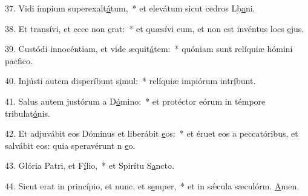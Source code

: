 37. Vidi ímpium superexalt\uline{á}tum,~* et elevátum sicut cedros Lb\uline{a}ni.\par 
38. Et transívi, et ecce non \uline{e}rat:~* et quæsívi eum, et non est invéntus locs \uline{e}jus.\par 
39. Custódi innocéntiam, et vide æquit\uline{á}tem:~* quóniam sunt relíquiæ hómini pacf\uline{i}co.\par 
40. Injústi autem disperíbunt s\uline{i}mul:~* relíquiæ impiórum intr\uline{í}bunt.\par 
41. Salus autem justórum a D\uline{ó}mino:~* et protéctor eórum in témpore tribulat\uline{ó}nis.\par 
42. Et adjuvábit eos Dóminus et liberábit \uline{e}os:~* et éruet eos a peccatóribus, et salvábit eos: quia speravérunt n \uline{e}o.\par 
43. Glória Patri, et F\uline{í}lio,~* et Spirítu S\uline{a}ncto.\par 
44. Sicut erat in princípio, et nunc, et s\uline{e}mper,~* et in sǽcula sæculórm. \uline{A}men.\par 
